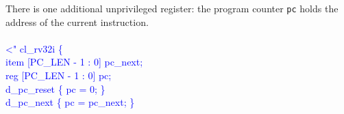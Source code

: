 There is one additional unprivileged register: the program counter {\tt pc}
holds the address of the current instruction.\\
\\
\textcolor{blue}{
\noindent \textless" cl\_rv32i \{\\%
\indent item [PC\_LEN - 1 : 0] pc\_next; \\%
\indent reg [PC\_LEN - 1 : 0] pc; \\%
\indent d\_pc\_reset \{ pc = 0; \} \\%
\indent d\_pc\_next \{ pc = pc\_next; \} \\%
}

